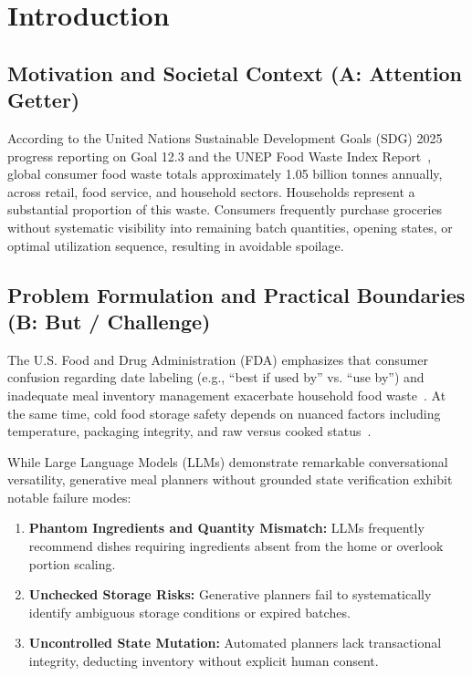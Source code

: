 \section{Introduction}

\subsection{Motivation and Societal Context (A: Attention Getter)}
According to the United Nations Sustainable Development Goals (SDG) 2025 progress reporting on Goal 12.3 and the UNEP Food Waste Index Report~\cite{R1_UN_SDG2025, R7_UNEP2024}, global consumer food waste totals approximately 1.05 billion tonnes annually, across retail, food service, and household sectors. Households represent a substantial proportion of this waste. Consumers frequently purchase groceries without systematic visibility into remaining batch quantities, opening states, or optimal utilization sequence, resulting in avoidable spoilage. 

\subsection{Problem Formulation and Practical Boundaries (B: But / Challenge)}
The U.S. Food and Drug Administration (FDA) emphasizes that consumer confusion regarding date labeling (e.g., ``best if used by'' vs. ``use by'') and inadequate meal inventory management exacerbate household food waste~\cite{R2_FDA2026}. At the same time, cold food storage safety depends on nuanced factors including temperature, packaging integrity, and raw versus cooked status~\cite{R3_FoodSafety2023}. 

While Large Language Models (LLMs) demonstrate remarkable conversational versatility, generative meal planners without grounded state verification exhibit notable failure modes:
\begin{enumerate}
    \item \textbf{Phantom Ingredients and Quantity Mismatch:} LLMs frequently recommend dishes requiring ingredients absent from the home or overlook portion scaling.
    \item \textbf{Unchecked Storage Risks:} Generative planners fail to systematically identify ambiguous storage conditions or expired batches.
    \item \textbf{Uncontrolled State Mutation:} Automated planners lack transactional integrity, deducting inventory without explicit human consent.
\end{enumerate}

